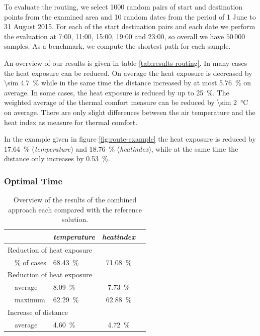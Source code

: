 To evaluate the routing, we select 1000 random pairs of start and destination points from the examined  area and 10 random dates from the period of 1 June to 31 August 2015. For each of the start destination pairs and each date we  perform the evaluation at 7:00, 11:00, 15:00, 19:00 and 23:00, so overall we have $50\,000$ samples. As a benchmark, we compute the shortest path for each sample. 


An overview of our results is given in table \ref{tab:results-routing}. In many cases the heat exposure can be reduced. On average the heat exposure is decreased by \SI{\sim 4.7}{\percent} while in the same time the distance increased by at most \SI{5.76}{\percent} on average. In some cases, the heat exposure is reduced by up to \SI{25}{\percent}. The weighted average of the thermal comfort measure can be reduced by \SI{\sim 2}{\celsius} on average. There are only slight differences between the air temperature and the heat index as measure for thermal comfort. 

In the example given in figure \ref{fig:route-example} the heat exposure is reduced by \SI{17.64}{\percent} (\emph{temperature}) and \SI{18.76}{\percent} (\emph{heatindex}), while at the same time the distance only increases by  \SI{0.53}{\percent}.

\subsubsection{Optimal Time}

\begin{table}
	\centering
	\begin{tabular}{lp{9.25cm}lcc}
		\toprule
		& & \emph{temperature} & \emph{heatindex} \\
		\midrule
		\multicolumn{4}{l}{Reduction of heat exposure}   \\
		& \% of cases  & \SI{68.43}{\percent} & \SI{71.08}{\percent}  \\
		\multicolumn{4}{l}{Reduction of heat exposure}  \\
		& average  & \SI{8.09}{\percent} & \SI{7.73}{\percent}  \\
		& maximum  & \SI{62.29}{\percent} & \SI{62.88}{\percent}  \\
		\multicolumn{4}{l}{Increase of distance}  \\
		& average  & \SI{4.60}{\percent}  & \SI{4.72}{\percent}  \\
		\bottomrule
	\end{tabular}
	\caption{Overview of the results of the combined approach each compared with the reference solution.  \label{tab:results-optimal-time}}
\end{table}

